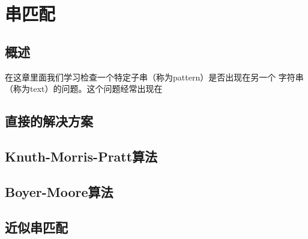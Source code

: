 \chapter{串匹配}
\section{概述}
在这章里面我们学习检查一个特定子串（称为pattern）是否出现在另一个
字符串（称为text）的问题。这个问题经常出现在

\section{直接的解决方案}
\section{Knuth-Morris-Pratt算法}
\section{Boyer-Moore算法}
\section{近似串匹配}
